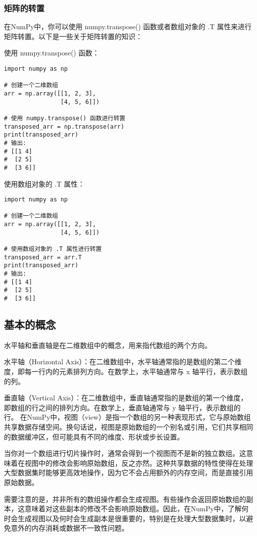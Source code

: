 \documentclass{article}
\begin{document}
\subsubsection{矩阵的转置}
在NumPy中，你可以使用 numpy.transpose() 函数或者数组对象的 .T 属性来进行矩阵转置。以下是一些关于矩阵转置的知识：

使用 numpy.transpose() 函数：
\begin{lstlisting}[caption={示例Python代码}]
import numpy as np

# 创建一个二维数组
arr = np.array([[1, 2, 3],
                [4, 5, 6]])

# 使用 numpy.transpose() 函数进行转置
transposed_arr = np.transpose(arr)
print(transposed_arr)
# 输出:
# [[1 4]
#  [2 5]
#  [3 6]]
\end{lstlisting}
使用数组对象的 .T 属性：
\begin{lstlisting}[caption={示例Python代码}]
import numpy as np

# 创建一个二维数组
arr = np.array([[1, 2, 3],
                [4, 5, 6]])

# 使用数组对象的 .T 属性进行转置
transposed_arr = arr.T
print(transposed_arr)
# 输出:
# [[1 4]
#  [2 5]
#  [3 6]]
\end{lstlisting}
\subsection{基本的概念}水平轴和垂直轴是在二维数组中的概念，用来指代数组的两个方向。

水平轴（Horizontal Axis）：在二维数组中，水平轴通常指的是数组的第二个维度，即每一行内的元素排列方向。在数学上，水平轴通常与 x 轴平行，表示数组的列。

垂直轴（Vertical Axis）：在二维数组中，垂直轴通常指的是数组的第一个维度，即数组的行之间的排列方向。在数学上，垂直轴通常与 y 轴平行，表示数组的行。
在NumPy中，视图（view）是指一个数组的另一种表现形式，它与原始数组共享数据存储空间。换句话说，视图是原始数组的一个别名或引用，它们共享相同的数据缓冲区，但可能具有不同的维度、形状或步长设置。

当你对一个数组进行切片操作时，通常会得到一个视图而不是新的独立数组。这意味着在视图中的修改会影响原始数组，反之亦然。这种共享数据的特性使得在处理大型数据集时能够更高效地操作，因为它不会占用额外的内存空间，而是直接引用原始数据。

需要注意的是，并非所有的数组操作都会生成视图。有些操作会返回原始数组的副本，这意味着对这些副本的修改不会影响原始数组。因此，在NumPy中，了解何时会生成视图以及何时会生成副本是很重要的，特别是在处理大型数据集时，以避免意外的内存消耗或数据不一致性问题。
\end{document}
